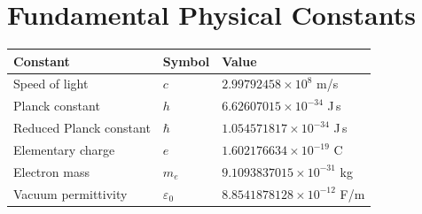 \chapter*{Fundamental Physical Constants}

\begin{tabular}{lll}
	Constant & Symbol & Value\\
	\hline
	Speed of light & $c$ & $2.99792458\times10^8$ m/s\\
	Planck constant & $h$ & $6.62607015\times10^{-34}$ J\,s\\
	Reduced Planck constant & $\hbar$ & $1.054571817\times10^{-34}$ J\,s\\
	Elementary charge & $e$ & $1.602176634\times10^{-19}$ C\\
	Electron mass & $m_e$ & $9.1093837015\times10^{-31}$ kg\\
	Vacuum permittivity & $\varepsilon_0$ & $8.8541878128\times10^{-12}$ F/m\\
\end{tabular}

